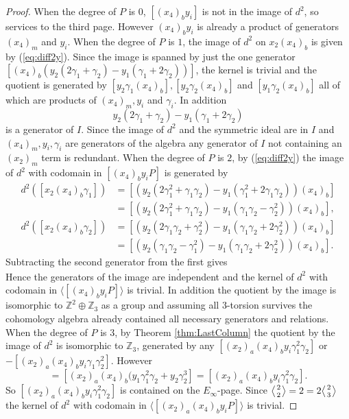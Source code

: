 \documentclass{article}
\theoremstyle{plain}
\theoremstyle{definition}
\numberwithin{thm}{section}
\begin{document}
\begin{proof}
				When the degree of $P$ is $0$, $[(x_4)_by_i]$ is not in the image of $d^2$, so services to the third page.
				However $(x_4)_by_i$ is already a product of generators $(x_4)_m$ and $y_i$.
				When the degree of $P$ is $1$, the image of $d^2$ on $x_2(x_4)_b$ is given by (\ref{eq:diff2y}).
				Since the image is spanned by just the one generator $[(x_4)_b(y_2(2\gamma_1+\gamma_2)-y_1(\gamma_1+2\gamma_2))]$,
				the kernel is trivial and the quotient is generated by $[y_2\gamma_1(x_4)_b],[y_2\gamma_2(x_4)_b]$ and $[y_1\gamma_2(x_4)_b]$
				all of which are products of $(x_4)_m,y_i$ and $\gamma_i$. 
				In addition
				\begin{equation*}
					y_2(2\gamma_1+\gamma_2)-y_1(\gamma_1+2\gamma_2)
				\end{equation*}
				is a generator of $I$.
				Since the image of $d^2$ and the symmetric ideal are in $I$ and $(x_4)_m,y_i,\gamma_i$ are generators of the algebra
				any generator of $I$ not containing an $(x_2)_m$ term is redundant. 
				When the degree of $P$ is $2$, by (\ref{eq:diff2y}) the image of $d^2$ with codomain in $[(x_4)_by_iP]$ is generated by
				\begin{align*}
					d^2([x_2(x_4)_b\gamma_1])
					&=[(y_2(2\gamma_1^2+\gamma_1\gamma_2)-y_1(\gamma_1^2+2\gamma_1\gamma_2))(x_4)_b] \\
					&=[(y_2(2\gamma_1^2+\gamma_1\gamma_2)-y_1(\gamma_1\gamma_2-\gamma_2^2))(x_4)_b], \\
					d^2([x_2(x_4)_b\gamma_2])
					&=[(y_2(2\gamma_1\gamma_2+\gamma_2^2)-y_1(\gamma_1\gamma_2+2\gamma_2^2))(x_4)_b] \\
					&=[(y_2(\gamma_1\gamma_2-\gamma_1^2)-y_1(\gamma_1\gamma_2+2\gamma_2^2))(x_4)_b].
				\end{align*}
				Subtracting the second generator from the first gives 
				\begin{equation*}
					[3(y_1\gamma_1^2+y_2\gamma_2^2)(x_4)_b].
				\end{equation*}
				Hence the generators of the image are independent and the kernel of $d^2$ with codomain in $\langle [(x_4)_by_iP] \rangle$ is trivial.
				In addition the quotient by the image is isomorphic to $\mathbb{Z}^2\oplus \mathbb{Z}_3$ as a group
				and assuming all $3$-torsion survives the cohomology algebra already contained all necessary generators and relations.
				When the degree of $P$ is $3$, by Theorem \ref{thm:LastColumn} the quotient by the image of $d^2$ is isomorphic to $\mathbb{Z}_3$,
				generated by any $[(x_2)_a(x_4)_by_i\gamma_1^2\gamma_2]$ or $-[(x_2)_a(x_4)_by_i\gamma_1\gamma_2^2]$.
				However
				\begin{equation*}
					[(x_2)_a(x_4)_b\gamma_2(y_1\gamma_1^2+y_2\gamma_2^2)]=[(x_2)_a(x_4)_b(y_1\gamma_1^2\gamma_2+y_2\gamma_2^3]=[(x_2)_a(x_4)_by_i\gamma_1^2\gamma_2].
				\end{equation*}
				So
				$[(x_2)_a(x_4)_by_i\gamma_1^2\gamma_2]$ is contained on the $E_\infty$-page.
				Since ${\ensuremath{\left \langle \genfrac{}{}{0pt}{}{{2}}{{2}}\right \rangle}}=2=2{\ensuremath{\left \langle \genfrac{}{}{0pt}{}{{2}}{{3}}\right \rangle}}$ the kernel of $d^2$ with codomain in $\langle [(x_2)_a(x_4)_by_iP] \rangle$ is trivial.


\end{proof}
\end{document}
